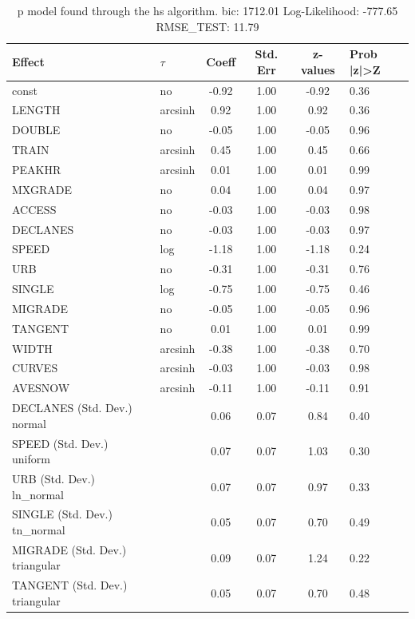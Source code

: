 \begin{table}
	\caption{p model found through the hs algorithm. bic: 1712.01 Log-Likelihood: -777.65 RMSE_TEST: 11.79}
	\begin{center}
		\begin{tabular}{|l|l|c|c|c|l|}
			\hline
			Effect & $\tau$ & Coeff & Std. Err & z-values & Prob |z|>Z \\
			\hline
			const & no & -0.92 & 1.00 & -0.92 & 0.36 \\
			\hline
			LENGTH & arcsinh & 0.92 & 1.00 & 0.92 & 0.36 \\
			\hline
			DOUBLE & no & -0.05 & 1.00 & -0.05 & 0.96 \\
			\hline
			TRAIN & arcsinh & 0.45 & 1.00 & 0.45 & 0.66 \\
			\hline
			PEAKHR & arcsinh & 0.01 & 1.00 & 0.01 & 0.99 \\
			\hline
			MXGRADE & no & 0.04 & 1.00 & 0.04 & 0.97 \\
			\hline
			ACCESS & no & -0.03 & 1.00 & -0.03 & 0.98 \\
			\hline
			DECLANES & no & -0.03 & 1.00 & -0.03 & 0.97 \\
			\hline
			SPEED & log & -1.18 & 1.00 & -1.18 & 0.24 \\
			\hline
			URB & no & -0.31 & 1.00 & -0.31 & 0.76 \\
			\hline
			SINGLE & log & -0.75 & 1.00 & -0.75 & 0.46 \\
			\hline
			MIGRADE & no & -0.05 & 1.00 & -0.05 & 0.96 \\
			\hline
			TANGENT & no & 0.01 & 1.00 & 0.01 & 0.99 \\
			\hline
			WIDTH & arcsinh & -0.38 & 1.00 & -0.38 & 0.70 \\
			\hline
			CURVES & arcsinh & -0.03 & 1.00 & -0.03 & 0.98 \\
			\hline
			AVESNOW & arcsinh & -0.11 & 1.00 & -0.11 & 0.91 \\
			\hline
			DECLANES (Std. Dev.) normal &  & 0.06 & 0.07 & 0.84 & 0.40 \\
			\hline
			SPEED (Std. Dev.) uniform &  & 0.07 & 0.07 & 1.03 & 0.30 \\
			\hline
			URB (Std. Dev.) ln_normal &  & 0.07 & 0.07 & 0.97 & 0.33 \\
			\hline
			SINGLE (Std. Dev.) tn_normal &  & 0.05 & 0.07 & 0.70 & 0.49 \\
			\hline
			MIGRADE (Std. Dev.) triangular &  & 0.09 & 0.07 & 1.24 & 0.22 \\
			\hline
			TANGENT (Std. Dev.) triangular &  & 0.05 & 0.07 & 0.70 & 0.48 \\

\end{tabular}
\end{center}
\end{table}
